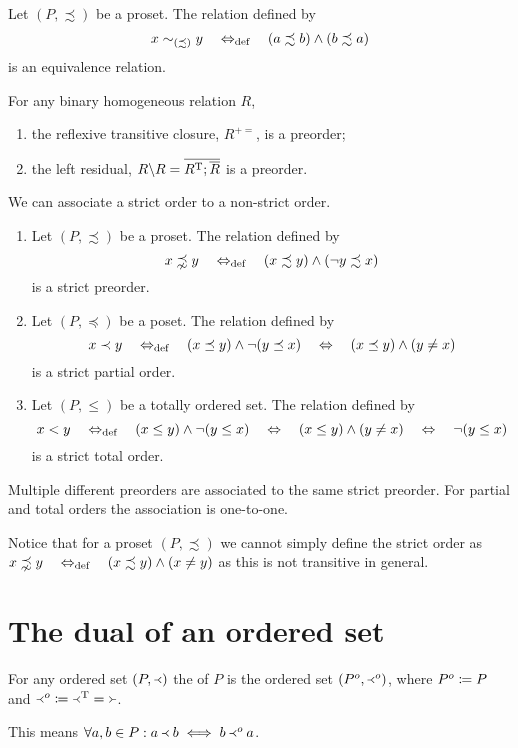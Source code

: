 \begin{lemma} \label{lemma:preorderEquivalence}
Let $(P, \precsim)$ be a proset. The relation defined by
\[ x \sim_{(\precsim)} y \quad\Leftrightarrow_{\text{def}}\quad (a\precsim b)\land (b\precsim a) \]
is an equivalence relation.
\end{lemma}

\begin{lemma}
For any binary homogeneous relation $R$,
\begin{enumerate}
\item the reflexive transitive closure, $R^{+=}$, is a preorder;
\item the left residual, $R\backslash R = \overline{R^{\mathrm{T}};\overline{R}}$ is a preorder.
\end{enumerate}
\end{lemma}

\begin{proposition}
We can associate a strict order to a non-strict order.
\begin{enumerate}
\item Let $(P, \precsim)$ be a proset. The relation defined by
\[ x\precnsim y \quad\Leftrightarrow_{\text{def}}\quad (x\precsim y)\land (\neg y\precsim x) \]
is a strict preorder.
\item Let $(P, \preceq)$ be a poset. The relation defined by
\[ x\prec y \quad\Leftrightarrow_{\text{def}}\quad (x\preceq y)\land \neg(y\preceq x) \quad \Leftrightarrow \quad (x\preceq y)\land (y\neq x) \]
is a strict partial order.
\item Let $(P, \leq)$ be a totally ordered set. The relation defined by
\[ x < y \quad\Leftrightarrow_{\text{def}}\quad (x\leq y)\land \neg(y\leq x) \quad \Leftrightarrow \quad (x\leq y)\land (y\neq x) \quad \Leftrightarrow \quad \neg(y\leq x)  \]
is a strict total order.
\end{enumerate}
Multiple different preorders are associated to the same strict preorder. For partial and total orders the association is one-to-one.
\end{proposition}
Notice that for a proset $(P, \precsim)$ we cannot simply define the strict order as $ x\precnsim y \quad\Leftrightarrow_{\text{def}}\quad (x\precsim y)\land (x\neq y)$ as this is not transitive in general.

\section{The dual of an ordered set}
\begin{definition}
For any ordered set $(P, \Yleft)$ the  of $P$ is the ordered set $(P^o, \Yleft^o)$, where $P^o \coloneqq P$ and $\Yleft^o \coloneqq \Yleft^{\mathrm{T}} = \Yright$.
\end{definition}
This means $\forall a,b\in P: a\Yleft b \iff b\Yleft^o a$.

